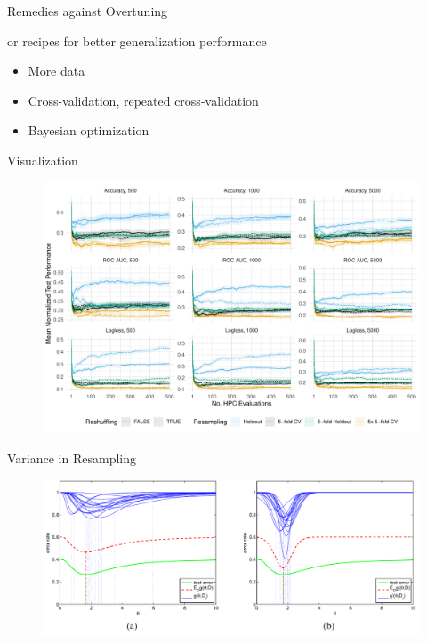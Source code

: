 \documentclass[11pt,compress,t,notes=noshow, xcolor=table]{beamer}
\begin{document}
\begin{frame}{Remedies against Overtuning}

\vfill

or recipes for better generalization performance

\vfill

    \begin{itemize}
        \item More data
        \item Cross-validation, repeated cross-validation
        \item Bayesian optimization
    \end{itemize}

\vfill
    
\end{frame}

\begin{frame}{Visualization}

\begin{figure}
    \centering
    \includegraphics[width=0.99\linewidth]{figure_man/normalized_test.pdf}
\end{figure}
    
\end{frame}

\begin{frame}{Variance in Resampling}

\vfill
\begin{figure}
    \centering
    \includegraphics[width=0.99\linewidth]{figure_man/biased_selection.png}
\end{figure}
\vfill
\end{frame}
\end{document}
